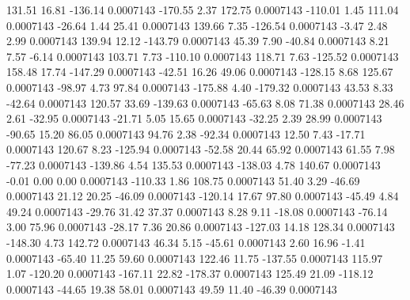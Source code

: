       131.51       16.81     -136.14     0.0007143
     -170.55        2.37      172.75     0.0007143
     -110.01        1.45      111.04     0.0007143
      -26.64        1.44       25.41     0.0007143
      139.66        7.35     -126.54     0.0007143
       -3.47        2.48        2.99     0.0007143
      139.94       12.12     -143.79     0.0007143
       45.39        7.90      -40.84     0.0007143
        8.21        7.57       -6.14     0.0007143
      103.71        7.73     -110.10     0.0007143
      118.71        7.63     -125.52     0.0007143
      158.48       17.74     -147.29     0.0007143
      -42.51       16.26       49.06     0.0007143
     -128.15        8.68      125.67     0.0007143
      -98.97        4.73       97.84     0.0007143
     -175.88        4.40     -179.32     0.0007143
       43.53        8.33      -42.64     0.0007143
      120.57       33.69     -139.63     0.0007143
      -65.63        8.08       71.38     0.0007143
       28.46        2.61      -32.95     0.0007143
      -21.71        5.05       15.65     0.0007143
      -32.25        2.39       28.99     0.0007143
      -90.65       15.20       86.05     0.0007143
       94.76        2.38      -92.34     0.0007143
       12.50        7.43      -17.71     0.0007143
      120.67        8.23     -125.94     0.0007143
      -52.58       20.44       65.92     0.0007143
       61.55        7.98      -77.23     0.0007143
     -139.86        4.54      135.53     0.0007143
     -138.03        4.78      140.67     0.0007143
       -0.01        0.00        0.00     0.0007143
     -110.33        1.86      108.75     0.0007143
       51.40        3.29      -46.69     0.0007143
       21.12       20.25      -46.09     0.0007143
     -120.14       17.67       97.80     0.0007143
      -45.49        4.84       49.24     0.0007143
      -29.76       31.42       37.37     0.0007143
        8.28        9.11      -18.08     0.0007143
      -76.14        3.00       75.96     0.0007143
      -28.17        7.36       20.86     0.0007143
     -127.03       14.18      128.34     0.0007143
     -148.30        4.73      142.72     0.0007143
       46.34        5.15      -45.61     0.0007143
        2.60       16.96       -1.41     0.0007143
      -65.40       11.25       59.60     0.0007143
      122.46       11.75     -137.55     0.0007143
      115.97        1.07     -120.20     0.0007143
     -167.11       22.82     -178.37     0.0007143
      125.49       21.09     -118.12     0.0007143
      -44.65       19.38       58.01     0.0007143
       49.59       11.40      -46.39     0.0007143
